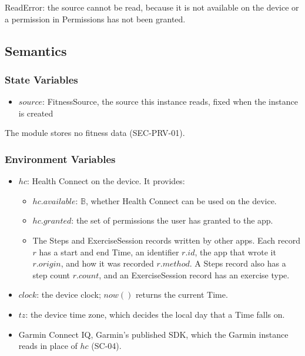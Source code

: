 \documentclass[12pt, titlepage]{article}
\begin{document}
\noindent ReadError: the source cannot be read, because it is not available on
the device or a permission in \textsf{Permissions} has not been granted.

\subsection{Semantics}

\subsubsection{State Variables}

\begin{itemize}
\item $\mathit{source}$: FitnessSource, the source this instance reads,
  fixed when the instance is created
\end{itemize}

\noindent The module stores no fitness data (SEC-PRV-01).

\subsubsection{Environment Variables}

\begin{itemize}
\item $\mathit{hc}$: Health Connect on the device. It provides:
  \begin{itemize}
  \item $\mathit{hc}.\mathit{available}$: $\mathbb{B}$, whether Health
    Connect can be used on the device.
  \item $\mathit{hc}.\mathit{granted}$: the set of permissions the user has
    granted to the app.
  \item The Steps and ExerciseSession records written by other apps. Each
    record $r$ has a start and end Time, an identifier $r.\mathit{id}$, the
    app that wrote it $r.\mathit{origin}$, and how it was recorded
    $r.\mathit{method}$. A Steps record also has a step count
    $r.\mathit{count}$, and an ExerciseSession record has an exercise type.
  \end{itemize}
\item $\mathit{clock}$: the device clock; $\mathit{now}()$ returns the
  current Time.
\item $\mathit{tz}$: the device time zone, which decides the local day that
  a Time falls on.
\item Garmin Connect IQ, Garmin's published SDK, which the Garmin instance
  reads in place of $\mathit{hc}$ (SC-04).
\end{itemize}
\end{document}
